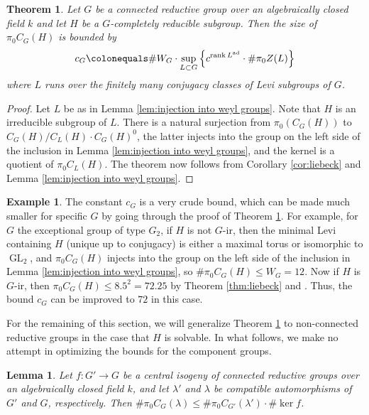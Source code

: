 \documentclass[11pt, letterpaper,english]{amsart}
\theoremstyle{plain}
\newtheorem{lemma}[lem]{Lemma}
\newtheorem{thm}[lem]{Theorem}
\theoremstyle{definition}
\newtheorem{example}[lem]{Example}
\numberwithin{equation}{section}
\numberwithin{lem}{section}
\DeclareMathOperator{\rank}{rank}
\DeclareMathOperator{\GL}{GL}
\DeclareMathOperator{\ad}{ad}
\newcommand{\cent}[2]{C_{#1}(#2)}
\begin{document}
\begin{thm} \label{thm:bound cpnt groups}
Let $G$ be a connected reductive group over an algebraically closed field $k$ and let $H$ be a $G$-completely reducible subgroup. 
Then the size of $\pi_0 \cent{G}{H}$ is bounded by 
\[
c_G \colonequals \# W_G \cdot \sup_{L \subset G} \left\{ c^{\rank L^{\ad}} \cdot \# \pi_0 Z(L) \right\}
\]
where $L$ runs over the finitely many conjugacy classes of Levi subgroups of $G$.
\end{thm}

\begin{proof}
Let $L$ be as in Lemma \ref{lem:injection into weyl groups}. Note that $H$ is an irreducible subgroup of $L$. 
There is a natural surjection from $\pi_0(C_G(H))$ to $C_G(H)/C_L(H)\cdot C_G(H)^0$, the latter injects into the group on the left side of the inclusion in Lemma \ref{lem:injection into weyl groups}, and the kernel is a quotient of $\pi_0 C_L(H)$. The theorem now follows from Corollary \ref{cor:liebeck} and Lemma \ref{lem:injection into weyl groups}. 
\end{proof}

\begin{example} \label{example:g2 bound}
The constant $c_G$ is a very crude bound, which can be made much smaller for specific $G$ by going through the proof of Theorem \ref{thm:bound cpnt groups}. For example, for $G$ the exceptional group of type $G_2$, if $H$ is not $G$-ir, then the minimal Levi containing $H$ (unique up to conjugacy) is either a maximal torus or isomorphic to $\GL_2$, and $\pi_0 \cent{G}{H}$ injects into the group on the left side of the inclusion in Lemma \ref{lem:injection into weyl groups}, so $\#\pi_0 \cent{G}{H} \leq W_G=12$. Now if $H$ is $G$-ir, then $\pi_0 \cent{G}{H} \leq 8.5^2=72.25$ by Theorem \ref{thm:liebeck} and \cite[Lemma 2.5]{liebeck}. Thus, the bound $c_G$ can be improved to $72$ in this case. %
\end{example}

For the remaining of this section, we will generalize Theorem \ref{thm:bound cpnt groups} to non-connected reductive groups in the case that $H$ is solvable. In what follows, we make no attempt in optimizing the bounds for the component groups. 

\begin{lemma} \label{lem:cpnt group isogeny}
Let $f \colon G' \to G$ be a central isogeny of connected reductive groups over an algebraically closed field $k$, and let $\lambda'$ and $\lambda$ be compatible automorphisms of $G'$ and $G$, respectively. Then 
$\# \pi_0 \cent{G}{\lambda} \leq \# \pi_0 \cent{G'}{\lambda'} \cdot \# \ker f$.
\end{lemma}
\end{document}
